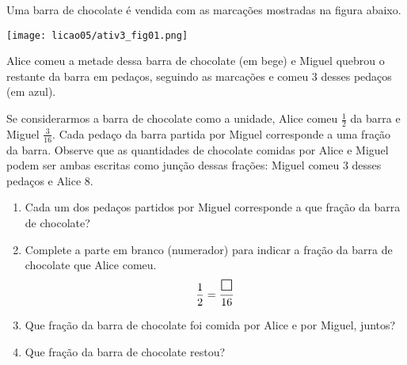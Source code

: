 \clearpage
\begin{atividade}{}\label{chap5-ativ3}



Uma barra de chocolate é vendida com as marcações mostradas na figura abaixo.

 \begin{center}
 \texttt{[image: licao05/ativ3\_fig01.png]}
 \end{center}


Alice comeu a metade dessa barra de chocolate (em bege) e Miguel quebrou o restante da barra em pedaços, seguindo as marcações e comeu 3 desses pedaços (em azul).

\begin{center}
\end{center}

Se considerarmos a barra de chocolate como a unidade, Alice comeu $\frac{1}{2}$ da barra e Miguel $\frac{3}{16}$. Cada pedaço da barra partida por Miguel corresponde a uma fração da barra. Observe que as quantidades de chocolate comidas por Alice e Miguel podem ser ambas escritas como junção dessas frações: Miguel comeu 3 desses pedaços e Alice 8.
\begin{enumerate}
\item Cada um dos pedaços partidos por Miguel corresponde a que fração da barra de chocolate?
\item Complete a parte em branco (numerador) para indicar a fração da barra de chocolate que Alice comeu.
$$\frac{1}{2} = \frac{\text{\Large $\square$} }{16}$$
\item Que fração da barra de chocolate foi comida por Alice e por Miguel, juntos?
\item  Que fração da barra de chocolate restou?
\end{enumerate}
\end{atividade}
\clearpage

